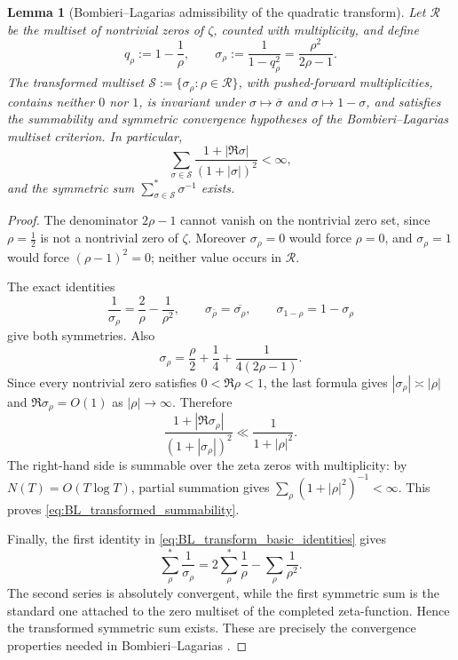 \documentclass[preprint,12pt]{elsarticle}
\numberwithin{equation}{section}
\theoremstyle{plain}
\newtheorem{lemma}[theorem]{Lemma}
\theoremstyle{definition}
\theoremstyle{remark}
\begin{document}
\begin{lemma}[Bombieri--Lagarias admissibility of the quadratic transform]
\label{lem:BL_transformed_multiset}
Let \(\mathcal R\) be the multiset of nontrivial zeros of \(\zeta\), counted with
multiplicity, and define
\begin{equation}
q_\rho:=1-\frac1\rho,
\qquad
\sigma_\rho:=\frac1{1-q_\rho^2}
=\frac{\rho^2}{2\rho-1}.
\label{eq:even_BL_transform}
\end{equation}
The transformed multiset
\(\mathcal S:=\{\sigma_\rho:\rho\in\mathcal R\}\), with pushed-forward multiplicities,
contains neither \(0\) nor \(1\), is invariant under
\(\sigma\mapsto\overline{\sigma}\) and \(\sigma\mapsto1-\sigma\), and satisfies the
summability and symmetric convergence hypotheses of the Bombieri--Lagarias multiset
criterion.  In particular,
\begin{equation}
\sum_{\sigma\in\mathcal S}
\frac{1+|\Re\sigma|}{(1+|\sigma|)^2}<\infty,
\label{eq:BL_transformed_summability}
\end{equation}
and the symmetric sum \(\sum_{\sigma\in\mathcal S}^{*}\sigma^{-1}\) exists.
\end{lemma}

\begin{proof}
The denominator \(2\rho-1\) cannot vanish on the nontrivial zero set, since
\(\rho=\tfrac12\) is not a nontrivial zero of \(\zeta\).  Moreover
\(\sigma_\rho=0\) would force \(\rho=0\), and \(\sigma_\rho=1\) would force
\((\rho-1)^2=0\); neither value occurs in \(\mathcal R\).

The exact identities
\begin{equation}
\frac1{\sigma_\rho}=\frac2\rho-\frac1{\rho^2},
\qquad
\sigma_{\bar\rho}=\overline{\sigma_\rho},
\qquad
\sigma_{1-\rho}=1-\sigma_\rho
\label{eq:BL_transform_basic_identities}
\end{equation}
give both symmetries.  Also
\begin{equation}
\sigma_\rho
=\frac\rho2+\frac14+\frac1{4(2\rho-1)}.
\label{eq:BL_transform_expansion}
\end{equation}
Since every nontrivial zero satisfies \(0<\Re\rho<1\), the last formula gives
\(|\sigma_\rho|\asymp|\rho|\) and \(\Re\sigma_\rho=O(1)\) as
\(|\rho|\to\infty\).  Therefore
\[
\frac{1+|\Re\sigma_\rho|}{(1+|\sigma_\rho|)^2}
\ll \frac1{1+|\rho|^2}.
\]
The right-hand side is summable over the zeta zeros with multiplicity: by
\(N(T)=O(T\log T)\), partial summation gives
\(\sum_\rho(1+|\rho|^2)^{-1}<\infty\).  This proves
\eqref{eq:BL_transformed_summability}.

Finally, the first identity in \eqref{eq:BL_transform_basic_identities} gives
\[
\sum_{\rho}^{*}\frac1{\sigma_\rho}
=
2\sum_{\rho}^{*}\frac1\rho-\sum_{\rho}\frac1{\rho^2}.
\]
The second series is absolutely convergent, while the first symmetric sum is the standard
one attached to the zero multiset of the completed zeta-function.  Hence the transformed
symmetric sum exists.  These are precisely the convergence properties needed in
Bombieri--Lagarias \cite[Theorem~1 and its symmetric corollary]{BombieriLagarias1999}.
\end{proof}
\end{document}
